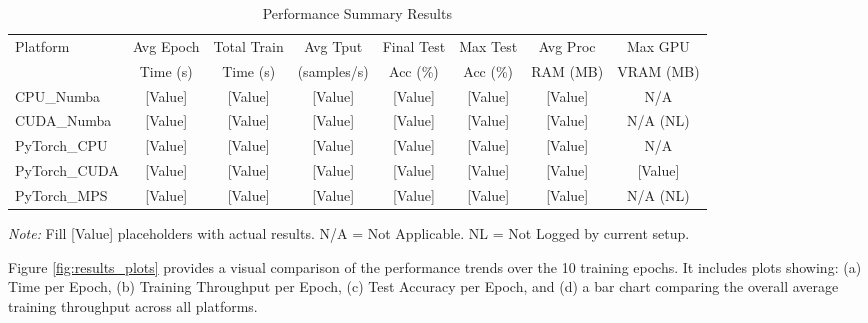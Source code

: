 \documentclass[conference]{IEEEtran} %
\begin{document}
\begin{table}[htbp]
    \centering
    \caption{Performance Summary Results}
    \label{tab:results_summary} %
    \renewcommand{\arraystretch}{1.1} %
    \begin{tabular}{@{}lccccccc@{}} %
        \toprule
        Platform       & Avg Epoch & Total Train & Avg Tput & Final Test & Max Test & Avg Proc & Max GPU \\
                       & Time (s)  & Time (s)    & (samples/s) & Acc (\%)   & Acc (\%) & RAM (MB) & VRAM (MB) \\
        \midrule
        CPU\_Numba      & [Value]   & [Value]     & [Value]     & [Value]    & [Value]  & [Value]  & N/A       \\
        CUDA\_Numba     & [Value]   & [Value]     & [Value]     & [Value]    & [Value]  & [Value]  & N/A (NL)  \\
        PyTorch\_CPU    & [Value]   & [Value]     & [Value]     & [Value]    & [Value]  & [Value]  & N/A       \\
        PyTorch\_CUDA   & [Value]   & [Value]     & [Value]     & [Value]    & [Value]  & [Value]  & [Value]   \\
        PyTorch\_MPS    & [Value]   & [Value]     & [Value]     & [Value]    & [Value]  & [Value]  & N/A (NL)  \\
        \bottomrule
    \end{tabular}
    \vspace{0.1cm}
    \footnotesize{\textit{Note:} Fill [Value] placeholders with actual results. N/A = Not Applicable. NL = Not Logged by current setup.}
\end{table}

Figure \ref{fig:results_plots} provides a visual comparison of the performance trends over the 10 training epochs. It includes plots showing: (a) Time per Epoch, (b) Training Throughput per Epoch, (c) Test Accuracy per Epoch, and (d) a bar chart comparing the overall average training throughput across all platforms.
\end{document}
